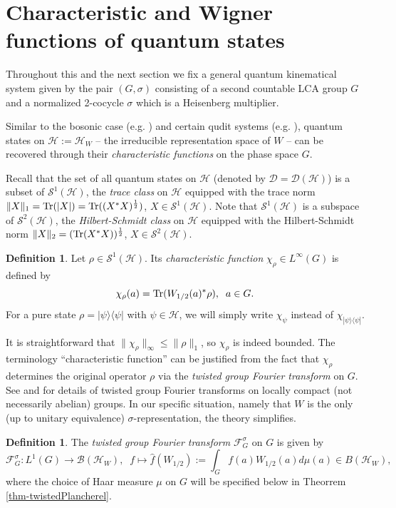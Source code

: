 \documentclass[12pt,reqno]{amsart}
\theoremstyle{definition}
\theoremstyle{definition}
\newtheorem{defn}[thm]{Definition}
\theoremstyle{definition}
\numberwithin{thm}{section}
\numberwithin{equation}{section}
\newcommand{\la}{\langle}
\newcommand{\ra}{\rangle}
\newcommand{\B}{\mathcal{B}}
\newcommand{\D}{\mathcal{D}}
\newcommand{\F}{\mathcal{F}}
\newcommand{\Hi}{\mathcal{H}}
\newcommand{\weyl}{{W}}
\newcommand{\mc}[1]{\mathcal #1}
\begin{document}
\section{Characteristic and Wigner functions of quantum states}

Throughout this and the next section we fix a general quantum kinematical system given by the pair $(G,\sigma)$ consisting of a second countable LCA group $G$ and a normalized 2-cocycle $\sigma$ which is a Heisenberg multiplier.

Similar to the bosonic case (e.g. \cite[\S 12]{Hol}) and certain qudit systems (e.g. \cite{Gro}), quantum states on $\Hi := \Hi_W$ -- the irreducible representation space of $W$ -- can be recovered through their {\em characteristic functions} on the phase space $G$.

Recall that the set of all quantum states on $\Hi$ (denoted by $\D = \D(\Hi)$) is a subset of $\mc S^1(\Hi)$, the \textit{trace class} on $\Hi$ equipped with the trace norm $\|X\|_1 = {\rm Tr}(|X|) ={\rm Tr}((X^*X)^{\frac{1}{2}})$, $X\in \mc S^1(\Hi)$. Note that $\mc S^1(\Hi)$ is a subspace of $\mc S^2(\Hi)$, the {\it Hilbert-Schmidt class} on $\Hi$ equipped with the Hilbert-Schmidt norm $\|X\|_2 = ({\rm Tr}(X^*X))^{\frac{1}{2}}$, $X\in \mc S^2(\Hi)$.

	\begin{defn} \label{defn-chftn}
		Let $\rho \in \mc S^1(\Hi)$. Its {\em characteristic function} $\chi_\rho \in L^\infty(G)$ is defined by
			$$\chi_\rho( a ) = {\rm Tr}(W_{1/2}( a )^*\rho),\;\; a\in G.$$
		For a pure state $\rho = |\psi \ra \la \psi |$ with $\psi \in \Hi$, we will simply write $\chi_\psi$ instead of $\chi_{|\psi \ra \la \psi |}$.	
	\end{defn}

It is straightforward that $\|\chi_{\rho}\|_{\infty}\leq \|\rho\|_1$, so $\chi_\rho$ is indeed bounded. The terminology ``characteristic function'' can be justified from the fact that $\chi_\rho$ determines the original operator $\rho$ via the {\em twisted group Fourier transform} on $G$. See \cite{KleppnerLipsman72} and \cite{Mackey} for details of twisted group Fourier transforms on locally compact (not necessarily abelian) groups. In our specific situation, namely that $W$ is the only (up to unitary equivalence) $\sigma$-representation, the theory simplifies.

	\begin{defn}
	The \textit{twisted group Fourier transform} $\F^\sigma_G$ on $G$ is given by
	    \begin{equation}\label{eq-twisted-Fourier-transform}
	        \F^\sigma_G: L^1(G) \to \B(\Hi_\weyl),\;\; f\mapsto \hat{f}(W_{1/2}):= \int_G f(a) W_{1/2}(a) d\mu(a) \in B(\Hi_W),
	    \end{equation}
where the choice of Haar measure $\mu$ on $G$ will be specified below in Theorrem \ref{thm-twistedPlancherel}.
	\end{defn}
\end{document}
